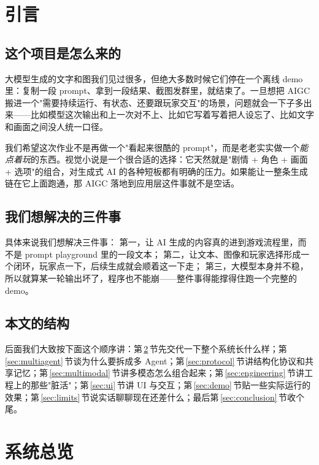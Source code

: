 \documentclass[12pt,a4paper]{article}
\begin{document}
\setcounter{page}{1}

\section{引言}

\subsection{这个项目是怎么来的}
大模型生成的文字和图我们见过很多，但绝大多数时候它们停在一个离线 demo 里：复制一段 prompt、拿到一段结果、截图发群里，就结束了。一旦想把 AIGC 搬进一个"需要持续运行、有状态、还要跟玩家交互"的场景，问题就会一下子多出来——比如模型这次输出和上一次对不上、比如它写着写着把人设忘了、比如文字和画面之间没人统一口径。

我们希望这次作业不是再做一个"看起来很酷的 prompt"，而是老老实实做一个\emph{能点着玩}的东西。视觉小说是一个很合适的选择：它天然就是"剧情 + 角色 + 画面 + 选项"的组合，对生成式 AI 的各种短板都有明确的压力。如果能让一整条生成链在它上面跑通，那 AIGC 落地到应用层这件事就不是空话。

\subsection{我们想解决的三件事}
具体来说我们想解决三件事：
第一，让 AI 生成的内容真的进到游戏流程里，而不是 prompt playground 里的一段文本；
第二，让文本、图像和玩家选择形成一个闭环，玩家点一下，后续生成就会顺着这一下走；
第三，大模型本身并不稳，所以就算某一轮输出坏了，程序也不能崩——整件事得能撑得住跑一个完整的 demo。

\subsection{本文的结构}
后面我们大致按下面这个顺序讲：第\,\ref{sec:overview}\,节先交代一下整个系统长什么样；第\,\ref{sec:multiagent}\,节谈为什么要拆成多 Agent；第\,\ref{sec:protocol}\,节讲结构化协议和共享记忆；第\,\ref{sec:multimodal}\,节讲多模态怎么组合起来；第\,\ref{sec:engineering}\,节讲工程上的那些"脏活"；第\,\ref{sec:ui}\,节讲 UI 与交互；第\,\ref{sec:demo}\,节贴一些实际运行的效果；第\,\ref{sec:limits}\,节说实话聊聊现在还差什么；最后第\,\ref{sec:conclusion}\,节收个尾。

\section{系统总览}
\label{sec:overview}
\end{document}

